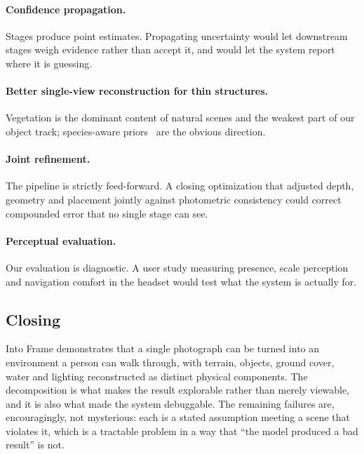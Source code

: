 \paragraph{Confidence propagation.} Stages produce point estimates. Propagating
uncertainty would let downstream stages weigh evidence rather than accept it, and
would let the system report where it is guessing.

\paragraph{Better single-view reconstruction for thin structures.} Vegetation is
the dominant content of natural scenes and the weakest part of our object track;
species-aware priors~\cite{lee2024tree} are the obvious direction.

\paragraph{Joint refinement.} The pipeline is strictly feed-forward. A closing
optimization that adjusted depth, geometry and placement jointly against
photometric consistency could correct compounded error that no single stage can
see.

\paragraph{Perceptual evaluation.} Our evaluation is diagnostic. A user study
measuring presence, scale perception and navigation comfort in the headset would
test what the system is actually for.

\subsection{Closing}

Into Frame demonstrates that a single photograph can be turned into an environment
a person can walk through, with terrain, objects, ground cover, water and lighting
reconstructed as distinct physical components. The decomposition is what makes the
result explorable rather than merely viewable, and it is also what made the system
debuggable. The remaining failures are, encouragingly, not mysterious: each is a
stated assumption meeting a scene that violates it, which is a tractable problem in
a way that ``the model produced a bad result'' is not.

